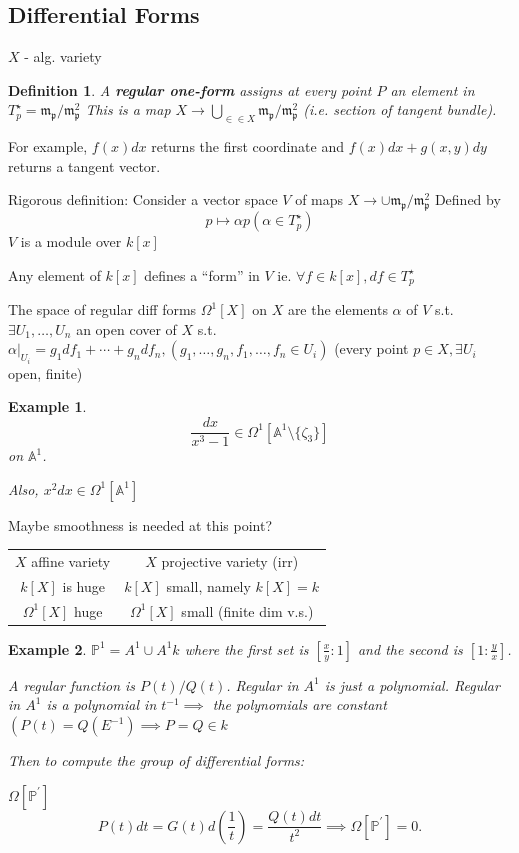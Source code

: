 \documentclass[12pt]{article}
\newtheorem{definition}{Definition}[section]
\newtheorem*{example}{Example}
\begin{document}
\subsection{Differential Forms}

$X$ - alg. variety

\begin{definition}
	A \textbf{regular one-form} assigns at every point $P$ an element in $T_p^\star =\mathfrak{m}_\mathfrak{p} / \mathfrak{m}_\mathfrak{p}^2$
	This is a map $X \rightarrow \bigcup_{\in \in X} \mathfrak{m}_\mathfrak{p} / \mathfrak{m}_\mathfrak{p}^2$ (i.e. section of tangent bundle).
\end{definition}

For example, $f(x)dx$ returns the first coordinate and $f(x) dx+g(x, y) dy$ returns a tangent vector.

Rigorous definition:
Consider a vector space $V $ of maps $X \rightarrow \cup \mathfrak{m}_{\mathfrak{p}} / \mathfrak{m}_\mathfrak{p}^2$
Defined by
\[
p \mapsto \alpha p (\alpha \in T_p^{\star })
\]
$V$ is a module over $k[x]$

Any element of $k[x]$ defines a ``form'' in $V$ ie. $\forall f \in k[x], df \in T_p^{\star }$

The space of regular diff forms $\Omega^1[X] $ on $X$ are the elements $\alpha$ of $V$ s.t. $\exists U_1, \ldots, U_n$ an open cover of $X$ s.t. $\left.\alpha\right|_{U_i}=g_1 d f_1+\cdots+g_n d f_n,\left(g_1, \ldots, g_n, f_1, \ldots, f_n \in U_i\right)$ (every point $p\in X, \exists U_i$ open, finite)

\begin{example}
	\[
		\frac{d x}{x^3-1} \in \Omega^1[\mathbb{A}^1 \setminus \{\zeta_3\} ]
	\]
	on $\mathbb{A}^1$.

	Also, $x^2 d x \in \Omega^{1}\left[\mathbb{A}^{1}\right]$
\end{example}

Maybe smoothness is needed at this point?

\begin{tabular}{c c}
$X$ affine variety & $X$ projective variety (irr)\\
$k[X]$ is huge & $k[X] $ small, namely $k[X] = k $ \\
$\Omega^{1}[X]$ huge & $\Omega^{1}[X]$ small (finite dim v.s.)
\end{tabular}

\begin{example}
	$\mathbb{P}^{1}=A^{1} \cup A^{1} k$ where the first set is $[\frac{x}{y}:1] $ and the second is $[1:\frac{y}{x}] $.

A regular function is $P(t) / Q(t)$.
Regular in $A^{1}$ is just a polynomial.
Regular in $A^{1}$ is a polynomial in $t^{-1} \implies$ the polynomials are constant $\left(P(t)=Q\left(E^{-1}\right)\right.\implies P = Q \in k$

Then to compute the group of differential forms:

$\Omega\left[\mathbb{P}^{\prime}\right]$
\[
P(t) d t=G(t) d\left(\frac{1}{t}\right)=\frac{Q(t) d t}{t^2} \implies \Omega\left[\mathbb{P}^{\prime}\right] = 0 \tag{ no constant works}
.\]
\end{example}
\end{document}

